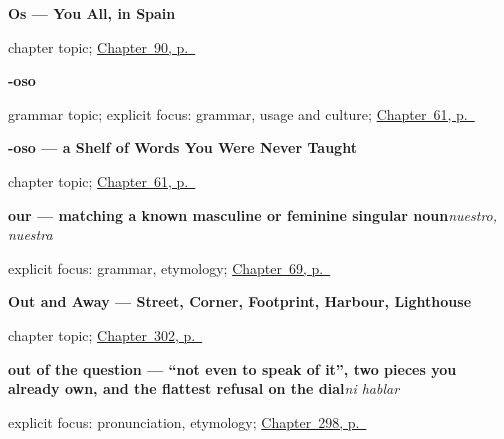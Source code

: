 \noindent\begin{minipage}[t]{\linewidth}
\raggedright
\textbf{Os --- You All, in Spain}\par
\footnotesize chapter topic; \hyperref[ch:pronoun-os]{Chapter~90, p.~\pageref*{ch:pronoun-os}}
\end{minipage}\par\smallskip

\noindent\begin{minipage}[t]{\linewidth}
\raggedright
\textbf{-oso}\par
\footnotesize grammar topic; explicit focus: grammar, usage and culture; \hyperref[ch:oso]{Chapter~61, p.~\pageref*{ch:oso}}
\end{minipage}\par\smallskip

\noindent\begin{minipage}[t]{\linewidth}
\raggedright
\textbf{-oso --- a Shelf of Words You Were Never Taught}\par
\footnotesize chapter topic; \hyperref[ch:oso]{Chapter~61, p.~\pageref*{ch:oso}}
\end{minipage}\par\smallskip

\noindent\begin{minipage}[t]{\linewidth}
\raggedright
\textbf{our — matching a known masculine or feminine singular noun}\enspace\emph{nuestro, nuestra}\par
\footnotesize explicit focus: grammar, etymology; \hyperref[ch:stem-changes]{Chapter~69, p.~\pageref*{ch:stem-changes}}
\end{minipage}\par\smallskip

\noindent\begin{minipage}[t]{\linewidth}
\raggedright
\textbf{Out and Away --- Street, Corner, Footprint, Harbour, Lighthouse}\par
\footnotesize chapter topic; \hyperref[ch:calle-y-faro]{Chapter~302, p.~\pageref*{ch:calle-y-faro}}
\end{minipage}\par\smallskip

\noindent\begin{minipage}[t]{\linewidth}
\raggedright
\textbf{out of the question — \textquotedblleft{}not even to speak of it\textquotedblright{}, two pieces you already own, and the flattest refusal on the dial}\enspace\emph{ni hablar}\par
\footnotesize explicit focus: pronunciation, etymology; \hyperref[ch:mas-respuestas]{Chapter~298, p.~\pageref*{ch:mas-respuestas}}
\end{minipage}\par\smallskip

